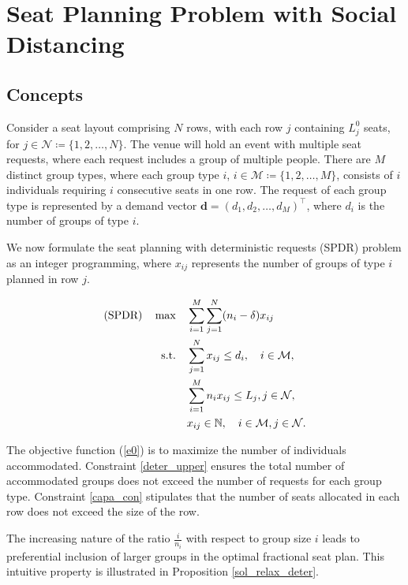\section{Seat Planning Problem with Social Distancing}\label{problem_description}

\subsection{Concepts}
Consider a seat layout comprising $N$ rows, with each row $j$ containing $L_j^0$ seats, for  $j \in \mathcal{N} \coloneqq \{1,2, \ldots, N\}$. The venue will hold an event with multiple seat requests, where each request includes a group of multiple people.
There are $M$ distinct group types, where each group type $i$, $i \in \mathcal{M} \coloneqq \{1, 2, \ldots, M\}$, consists of $i$ individuals requiring $i$ consecutive seats in one row. The request of each group type is represented by a demand vector $\mathbf{d} = (d_1, d_2, \ldots, d_M)^{\intercal}$, where $d_i$ is the number of groups of type $i$.


We now formulate the seat planning with deterministic requests (SPDR) problem as an integer programming, where $x_{ij}$ represents the number of groups of type $i$ planned in row $j$. 

\begin{align}
(\text{SPDR}) \quad \max \quad & \sum_{i=1}^{M}  \sum_{j= 1}^{N} (n_i - \delta) x_{ij} \label{e0} \\
\text {s.t.} \quad & \sum_{j= 1}^{N} x_{ij} \leq d_{i}, \quad i \in \mathcal{M}, \label{deter_upper}\\ 
& \sum_{i=1}^{M} n_{i} x_{ij} \leq L_j, j \in \mathcal{N}, \label{capa_con} \\
& x_{ij} \in \mathbb{N}, \quad i \in \mathcal{M}, j \in \mathcal{N}. \notag 
\end{align}


The objective function (\ref{e0}) is to maximize the number of individuals accommodated. Constraint \eqref{deter_upper} ensures the total number of accommodated groups does not exceed the number of requests for each group type. Constraint \eqref{capa_con} stipulates that the number of seats allocated in each row does not exceed the size of the row.

The increasing nature of the ratio $\frac{i}{n_i}$ with respect to group size $i$ leads to preferential inclusion of larger groups in the optimal fractional seat plan. This intuitive property is illustrated in Proposition \ref{sol_relax_deter}. 


